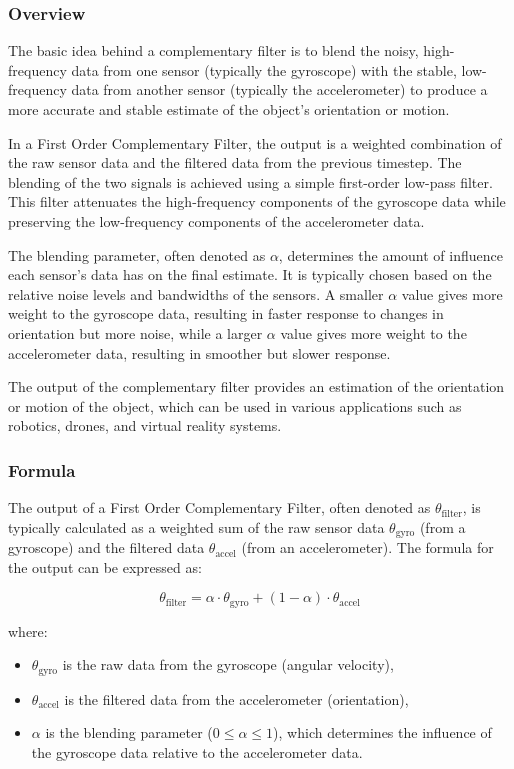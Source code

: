 \documentclass[conference]{IEEEtran}
\begin{document}
\subsubsection{Overview}
The basic idea behind a complementary filter is to blend the noisy, high-frequency data from one sensor (typically the gyroscope) with the stable, low-frequency data from another sensor (typically the accelerometer) to produce a more accurate and stable estimate of the object's orientation or motion.

In a First Order Complementary Filter, the output is a weighted combination of the raw sensor data and the filtered data from the previous timestep. The blending of the two signals is achieved using a simple first-order low-pass filter. This filter attenuates the high-frequency components of the gyroscope data while preserving the low-frequency components of the accelerometer data.

The blending parameter, often denoted as $\alpha$, determines the amount of influence each sensor's data has on the final estimate. It is typically chosen based on the relative noise levels and bandwidths of the sensors. A smaller $\alpha$ value gives more weight to the gyroscope data, resulting in faster response to changes in orientation but more noise, while a larger $\alpha$ value gives more weight to the accelerometer data, resulting in smoother but slower response.

The output of the complementary filter provides an estimation of the orientation or motion of the object, which can be used in various applications such as robotics, drones, and virtual reality systems.\\

\subsubsection{Formula}
The output of a First Order Complementary Filter, often denoted as \( \theta_{\text{filter}} \), is typically calculated as a weighted sum of the raw sensor data \( \theta_{\text{gyro}} \) (from a gyroscope) and the filtered data \( \theta_{\text{accel}} \) (from an accelerometer). The formula for the output can be expressed as:

\[ \theta_{\text{filter}} = \alpha \cdot \theta_{\text{gyro}} + (1 - \alpha) \cdot \theta_{\text{accel}} \]

where:
\begin{itemize}
    \item \( \theta_{\text{gyro}} \) is the raw data from the gyroscope (angular velocity),
    \item \( \theta_{\text{accel}} \) is the filtered data from the accelerometer (orientation),
    \item \( \alpha \) is the blending parameter (\( 0 \leq \alpha \leq 1 \)), which determines the influence of the gyroscope data relative to the accelerometer data.
\end{itemize}
\end{document}
